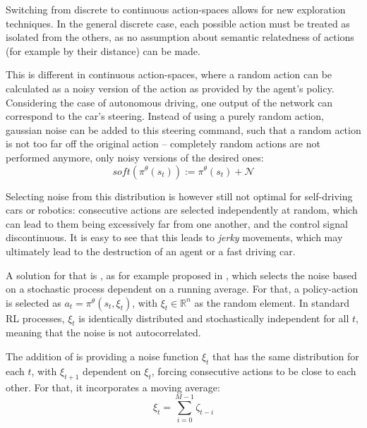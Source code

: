 \label{sec:contexptheory}

Switching from discrete to continuous action-spaces allows for new exploration techniques. In the general discrete case, each possible action must be treated as isolated from the others, as no assumption about semantic relatedness of actions (for example by their distance) can be made. 

This is different in continuous action-spaces, where a random action can be calculated as a noisy version of the action as provided by the agent's policy. Considering the case of autonomous driving, one output of the network can correspond to the car's steering. Instead of using a purely random action, gaussian noise can be added to this steering command, such that a random action is not too far off the original action -- completely random actions are not performed anymore, only noisy versions of the desired ones:
\begin{equation*}
	soft(\pi^\theta(s_t)) := \pi^\theta(s_t) + \mathcal{N}
\end{equation*}

Selecting noise from this distribution is however still not optimal for self-driving cars or robotics: consecutive actions are selected independently at random, which can lead to them being excessively far from one another, and the control signal discontinuous. It is easy to see that this leads to \textit{jerky} movements, which may ultimately lead to the destruction of an agent or a fast driving car. 

A solution for that is , as for example proposed in \cite{wawrzynski_control_2015}, which selects the noise based on a stochastic process dependent on a running average. For that, a policy-action is selected as $a_t = \pi^\theta(s_t, \xi_t)$, with $\xi_t \in \mathds{R}^n$ as the random element. In standard RL processes, $\xi_t$ is identically distributed and stochastically independent for all $t$, meaning that the noise is not autocorrelated.

The addition of \cite{wawrzynski_control_2015} is providing a noise function $\xi_t$ that has the same distribution for each $t$, with $\xi_{t+1}$ dependent on $\xi_t$, forcing consecutive actions to be close to each other. For that, it incorporates a moving average:\\
\begin{equation*}
	\xi_t = \sum^{M-1}_{i=0} \zeta_{t-i}
\end{equation*}


